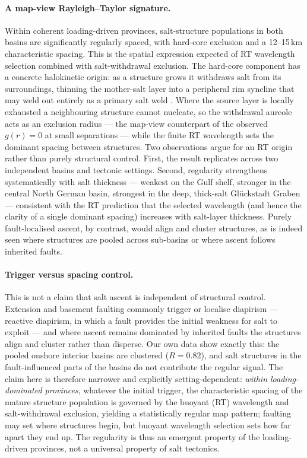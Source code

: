 \documentclass[11pt]{article}
\begin{document}
\paragraph{A map-view Rayleigh--Taylor signature.}
Within coherent loading-driven provinces, salt-structure populations in both basins are significantly
regularly spaced, with hard-core exclusion and a 12--15\,km characteristic spacing. This is the spatial
expression expected of RT wavelength selection combined with salt-withdrawal exclusion. The hard-core
component has a concrete halokinetic origin: as a structure grows it withdraws salt from its surroundings,
thinning the mother-salt layer into a peripheral rim syncline that may weld out entirely as a primary salt
weld \citep{hudec2007,jackson2017}. Where the source layer is locally exhausted a neighbouring structure
cannot nucleate, so the withdrawal aureole acts as an exclusion radius --- the map-view counterpart of the
observed $g(r)=0$ at small separations --- while the finite RT wavelength sets the dominant spacing between
structures. Two observations argue for an RT origin rather than purely structural control. First, the result
replicates across two independent basins and tectonic settings. Second, regularity strengthens
systematically with salt thickness --- weakest on the Gulf shelf, stronger in the central North German
basin, strongest in the deep, thick-salt Gl\"uckstadt Graben --- consistent with the RT prediction that the
selected wavelength (and hence the clarity of a single dominant spacing) increases with salt-layer
thickness. Purely fault-localised ascent, by contrast, would align and cluster structures, as is indeed seen
where structures are pooled across sub-basins or where ascent follows inherited faults.

\paragraph{Trigger versus spacing control.}
This is not a claim that salt ascent is independent of structural control. Extension and basement faulting
commonly trigger or localise diapirism --- reactive diapirism, in which a fault provides the initial
weakness for salt to exploit \citep{vendeville1992} --- and where ascent remains dominated by inherited
faults the structures align and cluster rather than disperse. Our own data show exactly this: the pooled
onshore interior basins are clustered ($R=0.82$), and salt structures in the fault-influenced parts of the
basins do not contribute the regular signal. The claim here is therefore narrower and explicitly
setting-dependent: \emph{within loading-dominated provinces}, whatever the initial trigger, the
characteristic spacing of the mature structure population is governed by the buoyant (RT) wavelength and
salt-withdrawal exclusion, yielding a statistically regular map pattern; faulting may set where structures
begin, but buoyant wavelength selection sets how far apart they end up. The regularity is thus an emergent
property of the loading-driven provinces, not a universal property of salt tectonics.
\end{document}
